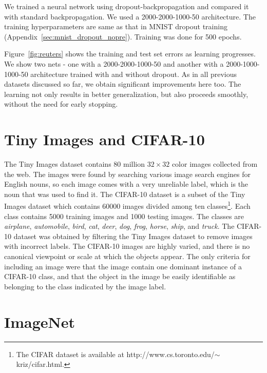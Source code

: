 \documentclass[12pt]{article}
\begin{document}
We trained a neural network using dropout-backpropagation and compared it with
standard backpropagation. We used a 2000-2000-1000-50 architecture. The training
hyperparameters are same as that in MNIST dropout training (Appendix~\ref{sec:mnist_dropout_nopre}). Training was done
for 500 epochs.

Figure~\ref{fig:reuters} shows the training and test set errors as learning
progresses. We show two nets - one with a 2000-2000-1000-50 and
another with a 2000-1000-1000-50 architecture trained with and without dropout.
As in all previous datasets discussed so far, we obtain significant improvements
here too. The learning not only results in better generalization, but also
proceeds smoothly, without the need for early stopping.

\section{Tiny Images and CIFAR-10}
\label{cifarsom}

The Tiny Images dataset contains 80 million $32\times32$ color images
collected from the web. The images were found by searching various
image search engines for English nouns, so each image comes with a
very unreliable label, which is the noun that was used to find it.
The CIFAR-10 dataset is a subset of the Tiny Images dataset which
contains 60000 images divided among ten classes\footnote{The CIFAR dataset is 
available at http://www.cs.toronto.edu/$\sim$kriz/cifar.html. }. Each class contains
5000 training images and 1000 testing images. The classes are \emph{airplane},
\emph{automobile}, \emph{bird}, \emph{cat}, \emph{deer}, \emph{dog},
\emph{frog}, \emph{horse}, \emph{ship}, and \emph{truck}. The CIFAR-10
dataset was obtained by filtering the Tiny Images dataset to remove
images with incorrect labels. The CIFAR-10 images are highly varied,
and there is no canonical viewpoint or scale at which the objects
appear. The only criteria for including an image were that the image
contain one dominant instance of a CIFAR-10 class, and that the object
in the image be easily identifiable as belonging to the class indicated
by the image label. 


\section{ImageNet}
\label{imagenetsom}
\end{document}
